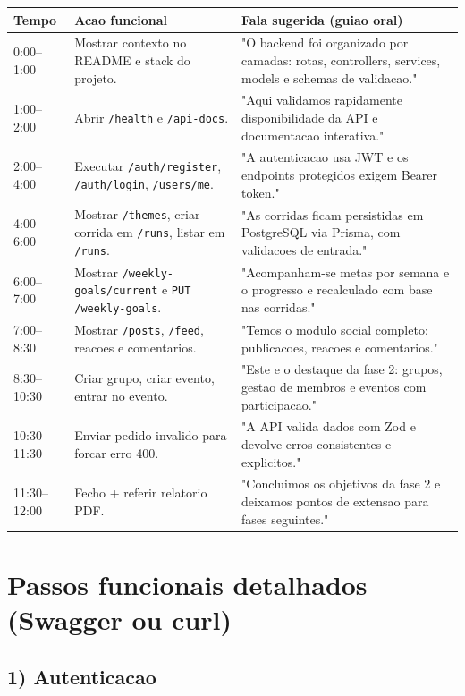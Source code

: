 \documentclass[11pt,a4paper]{article}
\begin{document}
\begin{longtable}{|p{}|p{}|p{}|}
\hline
\textbf{Tempo} & \textbf{Acao funcional} & \textbf{Fala sugerida (guiao oral)} \\
\hline
0:00--1:00 & Mostrar contexto no README e stack do projeto. & "O backend foi organizado por camadas: rotas, controllers, services, models e schemas de validacao." \\
\hline
1:00--2:00 & Abrir \texttt{/health} e \texttt{/api-docs}. & "Aqui validamos rapidamente disponibilidade da API e documentacao interativa." \\
\hline
2:00--4:00 & Executar \texttt{/auth/register}, \texttt{/auth/login}, \texttt{/users/me}. & "A autenticacao usa JWT e os endpoints protegidos exigem Bearer token." \\
\hline
4:00--6:00 & Mostrar \texttt{/themes}, criar corrida em \texttt{/runs}, listar em \texttt{/runs}. & "As corridas ficam persistidas em PostgreSQL via Prisma, com validacoes de entrada." \\
\hline
6:00--7:00 & Mostrar \texttt{/weekly-goals/current} e \texttt{PUT /weekly-goals}. & "Acompanham-se metas por semana e o progresso e recalculado com base nas corridas." \\
\hline
7:00--8:30 & Mostrar \texttt{/posts}, \texttt{/feed}, reacoes e comentarios. & "Temos o modulo social completo: publicacoes, reacoes e comentarios." \\
\hline
8:30--10:30 & Criar grupo, criar evento, entrar no evento. & "Este e o destaque da fase 2: grupos, gestao de membros e eventos com participacao." \\
\hline
10:30--11:30 & Enviar pedido invalido para forcar erro 400. & "A API valida dados com Zod e devolve erros consistentes e explicitos." \\
\hline
11:30--12:00 & Fecho + referir relatorio PDF. & "Concluimos os objetivos da fase 2 e deixamos pontos de extensao para fases seguintes." \\
\hline
\end{longtable}

\section{Passos funcionais detalhados (Swagger ou curl)}

\subsection{1) Autenticacao}
\end{document}

